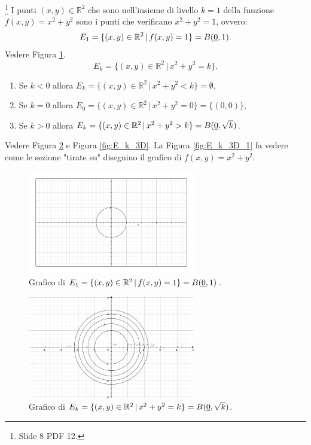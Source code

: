 \begin{example}\footnote{Slide 8 PDF 12.}
    I punti $(x,y)\in\mathbb R^2$ che sono nell'insieme di livello $k=1$ della funzione $f(x,y)=x^2+y^2$ sono i punti che verificano $x^2+y^2=1$, ovvero:
    \begin{equation*}
        E_1=\{(x,y)\in\mathbb R^2\,|\, f(x,y)=1\}=B(\uline 0, 1).
    \end{equation*}
    Vedere Figura \ref{fig:E_1}.
    \begin{equation*}
        E_k=\{(x,y)\in\mathbb R^2\,|\, x^2+y^2=k\}.
    \end{equation*}
    \begin{enumerate}
        \item Se $k<0$ allora $E_k=\{(x,y)\in\mathbb R^2\,|\, x^2+y^2<k\}=\emptyset$,
        \item Se $k=0$ allora $E_0=\{(x,y)\in\mathbb R^2\,|\, x^2+y^2=0\}=\{(0,0)\}$,
        \item Se $k>0$ allora $E_k=\{(x,y)\in\mathbb R^2\,|\, x^2+y^2>k\}=B(\uline 0,\sqrt{k})$.
    \end{enumerate}
    Vedere Figura \ref{fig:E_k_2D} e Figura \ref{fig:E_k_3D}. La Figura \ref{fig:E_k_3D_1} fa vedere come le sezione "tirate su" disegnino il grafico di $f(x,y)=x^2+y^2$.
    
    \begin{figure}
    \centering
    \includegraphics[width=0.65\textwidth]{Analisi2/figures/E_1.jpg}
        \caption{Grafico di $E_1=\{(x,y)\in\mathbb R^2\,|\, f(x,y)=1\}=B(\uline 0, 1)$.}\label{fig:E_1}
    \end{figure}
    
    \begin{figure}
    \centering
    \includegraphics[width=0.65\textwidth]{Analisi2/figures/E_k_2D.jpg}
        \caption{Grafico di $E_k=\{(x,y)\in\mathbb R^2\,|\, x^2+y^2=k\}=B(\uline 0, \sqrt{k})$.}\label{fig:E_k_2D}
    \end{figure}
    

\end{example}
